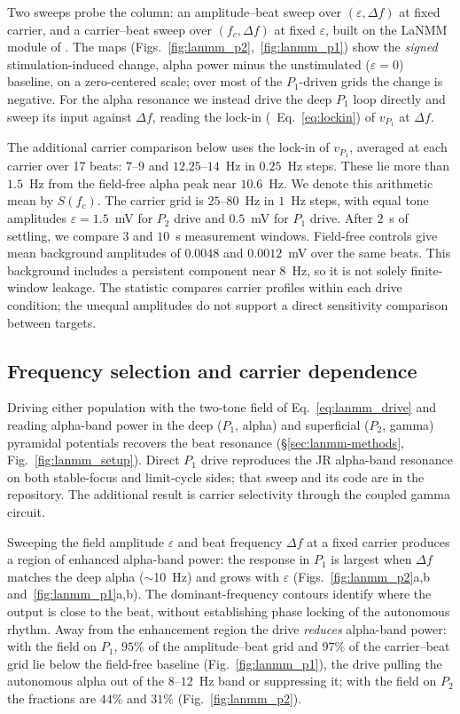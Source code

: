 \documentclass[11pt,a4paper]{article}
\newif\ifsupp
\begin{document}
Two sweeps probe the column: an amplitude--beat sweep over
$(\varepsilon,\Delta f)$ at fixed carrier, and a carrier--beat sweep
over $(f_c,\Delta f)$ at fixed $\varepsilon$, built on the LaNMM module of
\cite{ruffini2025cfc}. The maps
(Figs.~\ref{fig:lanmm_p2},~\ref{fig:lanmm_p1}) show the \emph{signed} stimulation-induced
change, alpha power minus the unstimulated ($\varepsilon=0$) baseline, on a zero-centered
scale; over most of the $P_1$-driven grids the change is negative. For the
alpha resonance we instead drive the deep $P_1$ loop directly and sweep its input against
$\Delta f$, reading the lock-in (\ifsupp main-text\fi\ Eq.~\eqref{eq:lockin}) of $v_{P_1}$ at $\Delta f$.

The additional carrier comparison below uses the lock-in
of $v_{P_1}$, averaged at each carrier over 17 beats: $7$--$9$ and
$12.25$--$14$~Hz in $0.25$~Hz steps. These lie more than $1.5$~Hz from the
field-free alpha peak near $10.6$~Hz. We denote this arithmetic mean by $S(f_c)$.
The carrier grid is $25$--$80$~Hz in $1$~Hz steps, with equal tone amplitudes
$\varepsilon=1.5$~mV for $P_2$ drive and $0.5$~mV for $P_1$ drive. After $2$~s
of settling, we compare $3$ and $10$~s measurement windows. Field-free controls
give mean background amplitudes of $0.0048$ and $0.0012$~mV over the same beats.
This background includes a persistent component near $8$~Hz, so it is not solely
finite-window leakage. The statistic compares carrier profiles within each drive
condition; the unequal amplitudes do not support a direct sensitivity comparison
between targets.

\subsection{Frequency selection and carrier dependence}\label{sec:lanmm-results}
Driving either population with the two-tone field of Eq.~\eqref{eq:lanmm_drive}
and reading alpha-band power in the deep ($P_1$, alpha) and superficial ($P_2$,
gamma) pyramidal potentials recovers the beat resonance
(\S\ref{sec:lanmm-methods}, Fig.~\ref{fig:lanmm_setup}). Direct $P_1$ drive reproduces the JR
alpha-band resonance on both stable-focus and limit-cycle sides; that sweep
and its code are in the repository. The additional result is carrier selectivity
through the coupled gamma circuit.

Sweeping the field amplitude $\varepsilon$ and beat frequency $\Delta f$ at a fixed
carrier produces a region of enhanced alpha-band power: the response in $P_1$ is largest
when $\Delta f$ matches the deep alpha ($\sim$10~Hz) and grows with $\varepsilon$
(Figs.~\ref{fig:lanmm_p2}a,b and~\ref{fig:lanmm_p1}a,b). The dominant-frequency
contours identify where the output is close to the beat, without establishing
phase locking of the autonomous rhythm. Away from the enhancement region the drive
\emph{reduces} alpha-band power: with the field on $P_1$, $95\%$ of the amplitude--beat
grid and $97\%$ of the carrier--beat grid lie below the field-free baseline
(Fig.~\ref{fig:lanmm_p1}), the drive pulling the autonomous alpha out of the $8$--$12$~Hz
band or suppressing it; with the field on $P_2$ the fractions are $44\%$ and $31\%$
(Fig.~\ref{fig:lanmm_p2}).
\end{document}
